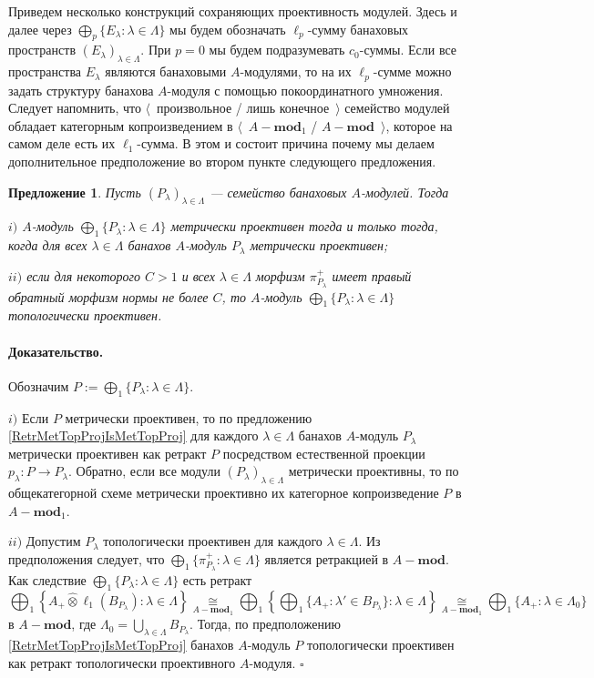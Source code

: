 \documentclass[12pt]{article}
\newcommand{\projtens}{\mathbin{\widehat{\otimes}}}
\newcommand{\isom}[1]{\mathop{\mathbin{\cong}}\limits_{#1}}
\newtheorem{proposition}[theorem]{Предложение}
\renewenvironment{proof}{\paragraph{Доказательство.}}{\hfill$\square$\medskip}
\begin{document}
Приведем несколько конструкций сохраняющих проективность модулей. Здесь и далее через $\bigoplus_p\{ E_\lambda:\lambda\in\Lambda\}$ мы будем обозначать $\ell_p$-сумму банаховых пространств $(E_\lambda)_{\lambda\in\Lambda}$. При $p=0$ мы будем подразумевать $c_0$-суммы. Если все пространства $E_\lambda$ являются банаховыми $A$-модулями, то на их $\ell_p$-сумме можно задать структуру банахова $A$-модуля с помощью покоординатного умножения. Следует напомнить, что $\langle$~произвольное / лишь конечное~$\rangle$ семейство модулей обладает категорным копроизведением в $\langle$~$A-\mathbf{mod}_1$ / $A-\mathbf{mod}$~$\rangle$, которое на самом деле есть их $\ell_1$-сумма. В этом и состоит причина почему мы делаем дополнительное предположение во втором пункте следующего предложения.

\begin{proposition}\label{MetTopProjModCoprod} Пусть $(P_\lambda)_{\lambda\in\Lambda}$ --- семейство банаховых $A$-модулей. Тогда 

$i)$ $A$-модуль $\bigoplus_1\{P_\lambda:\lambda\in\Lambda\}$ метрически проективен тогда и только тогда, когда для всех $\lambda\in\Lambda$ банахов $A$-модуль $P_\lambda$ метрически проективен;

$ii)$ если для некоторого $C>1$ и всех $\lambda\in\Lambda$ морфизм $\pi_{P_\lambda}^+$ имеет правый обратный морфизм нормы не более $C$, то $A$-модуль $\bigoplus_1\{P_\lambda:\lambda\in\Lambda\}$ топологически проективен.
\end{proposition}
\begin{proof} Обозначим $P:=\bigoplus_1\{P_\lambda:\lambda\in\Lambda\}$.

$i)$ Если $P$ метрически проективен, то по предложению \ref{RetrMetTopProjIsMetTopProj} для каждого $\lambda\in\Lambda$ банахов $A$-модуль $P_\lambda$ метрически проективен как ретракт $P$ посредством естественной проекции $p_\lambda:P\to P_\lambda$. Обратно, если все модули $(P_\lambda)_{\lambda\in\Lambda}$ метрически проективны, то по общекатегорной схеме метрически проективно их категорное копроизведение $P$ в $A-\mathbf{mod}_1$.

$ii)$ Допустим $P_\lambda$ топологически проективен для каждого $\lambda\in\Lambda$. Из предположения следует, что 	$\bigoplus_1\{\pi_{P_\lambda}^+:\lambda\in\Lambda\}$ является ретракцией в $A-\mathbf{mod}$. Как следствие $\bigoplus_1\{P_\lambda:\lambda\in\Lambda\}$ есть ретракт 
$$
\bigoplus\nolimits_1\left\{A_+\projtens \ell_1(B_{P_\lambda}):\lambda\in\Lambda\right\}
\isom{A-\mathbf{mod}_1}
\bigoplus\nolimits_1\left\{\bigoplus\nolimits_1\{A_+:\lambda'\in B_{P_\lambda}\}:\lambda\in\Lambda\right\}
\isom{A-\mathbf{mod}_1}
\bigoplus\nolimits_1\{A_+:\lambda\in\Lambda_0\}
$$
в $A-\mathbf{mod}$, где $\Lambda_0=\bigcup_{\lambda\in\Lambda}B_{P_\lambda}$. Тогда, по предположению \ref{RetrMetTopProjIsMetTopProj} банахов $A$-модуль $P$ топологически проективен как ретракт топологически проективного $A$-модуля.
\end{proof}
\end{document}
